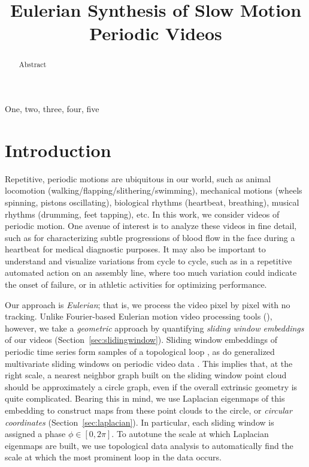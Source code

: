 \documentclass{article}
\title{Eulerian Synthesis of Slow Motion Periodic Videos}
\begin{document}
%
\maketitle
%


\begin{abstract}
Abstract
\end{abstract}
%
\begin{keywords}
One, two, three, four, five
\end{keywords}
%


\section{Introduction}

Repetitive, periodic motions are ubiquitous in our world, such as animal locomotion (walking/flapping/slithering/swimming), mechanical motions (wheels spinning, pistons oscillating), biological rhythms (heartbeat, breathing), musical rhythms (drumming, feet tapping), etc.  In this work, we consider videos of periodic motion.  One avenue of interest is to analyze these videos in fine detail, such as for characterizing subtle progressions of blood flow in the face during a heartbeat for medical diagnostic purposes.  It may also be important to understand and visualize variations from cycle to cycle, such as in a repetitive automated action on an assembly line, where too much variation could indicate the onset of failure, or in athletic activities for optimizing performance.  

Our approach is {\em Eulerian}; that is, we process the video pixel by pixel with no tracking.  Unlike Fourier-based Eulerian motion video processing tools (\cite{wu2012eulerian, wadhwa2013phase}), however, we take a {\em geometric} approach by quantifying {\em sliding window embeddings} of our videos (Section~\ref{sec:slidingwindow}).  Sliding window embeddings of periodic time series form samples of a topological loop \cite{perea2015sliding}, as do generalized multivariate sliding windows on periodic video data \cite{traliehigh, tralie2017quasi}.  This implies that, at the right scale, a nearest neighbor graph built on the sliding window point cloud should be approximately a circle graph, even if the overall extrinsic geometry is quite complicated.  Bearing this in mind, we use Laplacian eigenmaps \cite{belkin2003laplacian} of this embedding to construct maps from these point clouds to the circle, or {\em circular coordinates} (Section~\ref{sec:laplacian}).  In particular, each sliding window is assigned a phase $\phi \in [0, 2\pi]$.  To autotune the scale at which Laplacian eigenmaps are built, we use topological data analysis \cite{edelsbrunner2000topological,edelsbrunner2008persistent,edelsbrunner2010computational,carlsson2009topology,ghrist2014elementary} to automatically find the scale at which the most prominent loop in the data occurs.
\end{document}
